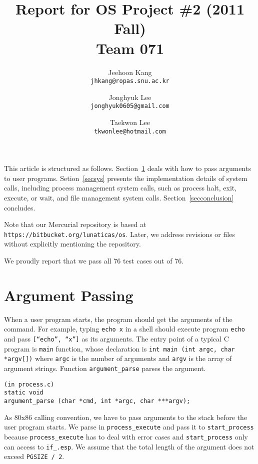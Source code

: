 \documentclass[a4paper,article,11pt,oneside]{article}
\begin{document}
\title{Report for OS Project \#2 (2011 Fall)\\Team 071}
\author{Jeehoon Kang\\\texttt{jhkang@ropas.snu.ac.kr}\and
  Jonghyuk Lee\\\texttt{jonghyuk0605@gmail.com} \and
  Taekwon Lee\\\texttt{tkwonlee@hotmail.com} }
\maketitle

This article is structured as follows. Section~\ref{secarg} deals with
how to pass arguments to user programs. Setion~\ref{secsys} presents
the implementation details of system calls, including process
management system calls, such as process halt, exit, execute, or
wait, and file management system calls. Section~\ref{secconclusion}
concludes.

Note that our Mercurial repository is based at
\texttt{https://bitbucket.org/lunaticas/os}. Later, we address
revisions or files without explicitly mentioning the repository.

We proudly report that we pass all 76 test cases out of 76.

\section{Argument Passing}\label{secarg}
When a user program starts, the program should get the arguments of
the command. For example, typing \texttt{echo x} in a shell should
execute program \texttt{echo} and pass \texttt{[``echo'', ``x'']} as
its arguments. The entry point of a typical C program is \texttt{main}
function, whose declaration is \texttt{int main (int argc, char
  *argv[])} where \texttt{argc} is the number of arguments and
\texttt{argv} is the array of argument strings. Function
\texttt{argument\_parse} parses the argument.
\begin{verbatim}
(in process.c)
static void
argument_parse (char *cmd, int *argc, char ***argv);
\end{verbatim}

As 80x86 calling convention, we have to pass arguments to the stack
before the user program starts. We parse in \texttt{process\_execute}
and pass it to \texttt{start\_process} because
\texttt{process\_execute} has to deal with error cases and
\texttt{start\_process} only can access to \texttt{if\_.esp}. We
assume that the total length of the argument does not exceed
\texttt{PGSIZE / 2}.
\end{document}
